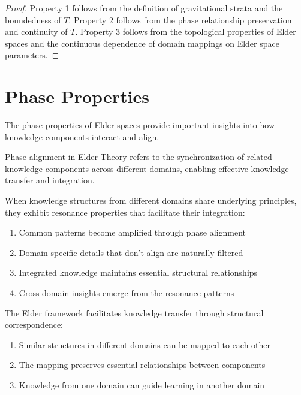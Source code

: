 \begin{proof}
Property 1 follows from the definition of gravitational strata and the boundedness of $T$. Property 2 follows from the phase relationship preservation and continuity of $T$. Property 3 follows from the topological properties of Elder spaces and the continuous dependence of domain mappings on Elder space parameters.
\end{proof}

\section{Phase Properties}

The phase properties of Elder spaces provide important insights into how knowledge components interact and align.

\begin{definition}
Phase alignment in Elder Theory refers to the synchronization of related knowledge components across different domains, enabling effective knowledge transfer and integration.
\end{definition}

\begin{theorem}
When knowledge structures from different domains share underlying principles, they exhibit resonance properties that facilitate their integration:
\begin{enumerate}
    \item Common patterns become amplified through phase alignment
    \item Domain-specific details that don't align are naturally filtered
    \item Integrated knowledge maintains essential structural relationships
    \item Cross-domain insights emerge from the resonance patterns
\end{enumerate}
\end{theorem}

\begin{theorem}
The Elder framework facilitates knowledge transfer through structural correspondence:
\begin{enumerate}
    \item Similar structures in different domains can be mapped to each other
    \item The mapping preserves essential relationships between components
    \item Knowledge from one domain can guide learning in another domain
\end{enumerate}
\end{theorem}

